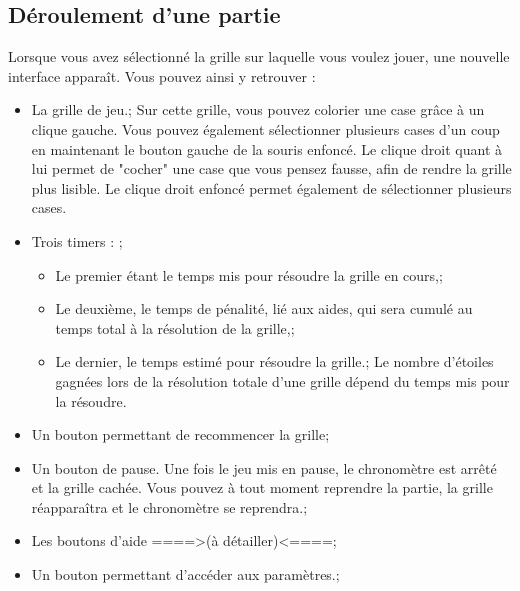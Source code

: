 \documentclass[a4paper, 12pt]{report}
\begin{document}
            
        \subsection{Déroulement d'une partie} %
        
            Lorsque vous avez sélectionné la grille sur laquelle vous voulez jouer, une nouvelle interface apparaît. 
            Vous pouvez ainsi y retrouver :
            \begin{itemize}
                \item La grille de jeu.;
                Sur cette grille, vous pouvez colorier une case grâce à un clique gauche. Vous pouvez également sélectionner plusieurs cases d'un coup en maintenant le bouton gauche de la souris enfoncé.
                Le clique droit quant à lui permet de "cocher" une case que vous pensez fausse, afin de rendre la grille plus lisible. Le clique droit enfoncé permet également de sélectionner plusieurs cases.
                \item Trois timers : ;
                \begin{itemize}
                    \item Le premier étant le temps mis pour résoudre la grille en cours,;
                    \item Le deuxième, le temps de pénalité, lié aux aides, qui sera cumulé au temps total à la résolution de la grille,;
                    \item Le dernier, le temps estimé pour résoudre la grille.;
                Le nombre d'étoiles gagnées lors de la résolution totale d'une grille dépend du temps mis pour la résoudre.
                \end{itemize}
                \item Un bouton permettant de recommencer la grille;
                \item Un bouton de pause. Une fois le jeu mis en pause, le chronomètre est arrêté et la grille cachée. Vous pouvez à tout moment reprendre la partie, la grille réapparaîtra et le chronomètre se reprendra.;
                \item Les boutons d'aide ====>(à détailler)<====;
                \item Un bouton permettant d'accéder aux paramètres.;
            \end{itemize}
            
\end{document}
